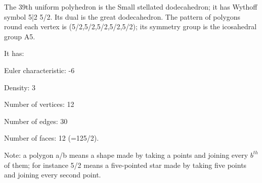 The 39th uniform polyhedron is the Small stellated dodecahedron; it has Wythoff symbol 5|2 5/2. Its dual is the great dodecahedron. The pattern of polygons round each vertex is (5/2,5/2,5/2,5/2,5/2); its symmetry group is the icosahedral group A5.\par
It has:\par
Euler characteristic: -6\par
Density: 3\par
Number of vertices: 12\par
Number of edges:  30\par
Number of faces: 12 (=12{5/2}).\par
Note: a polygon a/b means a shape made by taking a points and joining every $b^{th}$  of them; for instance 5/2 means a five-pointed star made by taking five points and joining every second point.